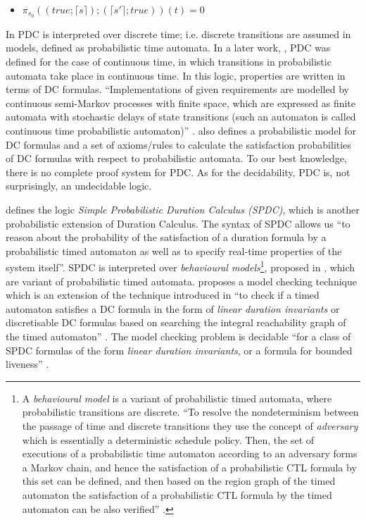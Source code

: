 \documentclass[11pt]{article}
\begin{document}
\begin{itemize}
\item $\pi_{s_{0}}((true;\lceil s \rceil);(\lceil s' \rceil;true))(t)=0$
\end{itemize}


In \cite{LRSZ92} PDC is interpreted over discrete time; i.e. discrete transitions are assumed in models, defined as probabilistic time automata. In a later work, \cite{HC94}, PDC was defined for the case of continuous time, in which  transitions in probabilistic automata take place in continuous time. In this logic, properties are written in terms of  DC formulas. ``Implementations of given requirements are modelled by continuous semi-Markov processes with finite space, which are expressed as finite automata with stochastic delays of state transitions (such an automaton is called continuous time probabilistic automaton)'' \cite{HC94}. \cite{HC94} also defines a probabilistic model for DC formulas and a set of axioms/rules to calculate the satisfaction probabilities of DC formulas with respect to probabilistic automata. To our best knowledge, there is no complete proof system for PDC. As for the decidability,  PDC is, not surprisingly, an undecidable logic.

\cite{HZ07} defines the logic \emph{Simple Probabilistic Duration Calculus (SPDC)}, which is another probabilistic extension of Duration Calculus. The syntax of SPDC allows us ``to reason about the probability of the satisfaction of a duration formula by a probabilistic timed automaton as well as to specify real-time properties of the system itself''. SPDC is interpreted over \emph{behavioural models}\footnote{A \emph{behavioural model} is a variant of probabilistic timed automata, where probabilistic transitions are discrete. ``To resolve the nondeterminism between the passage of time and discrete transitions they use the concept of \emph{adversary} which is essentially a deterministic schedule policy. Then, the set of executions of a probabilistic time automaton according to an adversary forms a Markov chain, and hence the satisfaction of a probabilistic CTL formula by this set can be defined, and then based on the region graph of the timed automaton the satisfaction of a probabilistic CTL formula by the timed automaton can be also verified'' \cite{CH06}.}, proposed in \cite{KNSS02}, which are variant of probabilistic timed automata. \cite{HZ07} proposes a model checking technique which is an extension of the technique introduced in \cite{TH04} ``to check if a timed automaton satisfies a DC formula in the form of \emph{linear duration invariants} or discretisable DC formulas based on searching the integral reachability graph of the timed automaton'' \cite{HZ07} . The model checking problem is decidable ``for a class of SPDC formulas of the form \emph{linear duration invariants}, or a formula for bounded liveness'' \cite{HZ07}.
\end{document}
